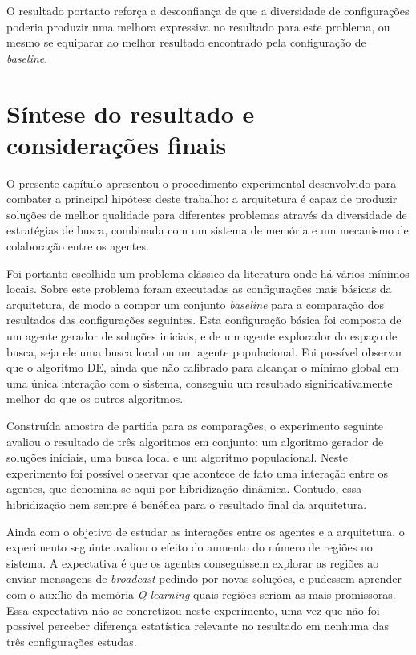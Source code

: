 O resultado portanto reforça a desconfiança de que a diversidade de configurações poderia produzir uma melhora expressiva no resultado para este problema, ou mesmo se equiparar ao melhor resultado encontrado pela configuração de \textit{baseline}.   

\section{Síntese do resultado e considerações finais}
\label{sec:sinteseDiversidade}

O presente capítulo apresentou o procedimento experimental desenvolvido para combater a principal hipótese deste trabalho: a arquitetura é capaz de produzir soluções de melhor qualidade para diferentes problemas através da diversidade de estratégias
de busca, combinada com um sistema de memória e um mecanismo de colaboração entre
os agentes.

Foi portanto escolhido um problema clássico da literatura onde há vários mínimos locais. Sobre este problema foram executadas as configurações mais básicas da arquitetura, de modo a compor um conjunto \textit{baseline} para a comparação dos resultados das configurações seguintes. Esta configuração básica foi composta de um agente gerador de soluções iniciais, e de um agente explorador do espaço de busca, seja ele uma busca local ou um agente populacional. Foi possível observar que o algoritmo DE, ainda que não calibrado para alcançar o mínimo global em uma única interação com o sistema, conseguiu um resultado significativamente melhor do que os outros algoritmos. 

Construída amostra de partida para as comparações, o experimento seguinte avaliou o resultado de três algoritmos em conjunto: um algoritmo gerador de soluções iniciais, uma busca local e um algoritmo populacional. Neste experimento foi possível observar que acontece de fato uma interação entre os agentes, que denomina-se aqui por hibridização dinâmica. Contudo, essa hibridização nem sempre é benéfica para o resultado final da arquitetura. 

Ainda com o objetivo de estudar as interações entre os agentes e a arquitetura, o experimento seguinte avaliou o efeito do aumento do número de regiões no sistema. A expectativa é que os agentes conseguissem explorar as regiões ao enviar mensagens de \textit{broadcast} pedindo por novas soluções, e pudessem aprender com o auxílio da memória \textit{Q-learning} quais regiões seriam as mais promissoras. Essa expectativa não se concretizou neste experimento, uma vez que não foi possível perceber diferença estatística relevante no resultado em nenhuma das três configurações estudas. 

